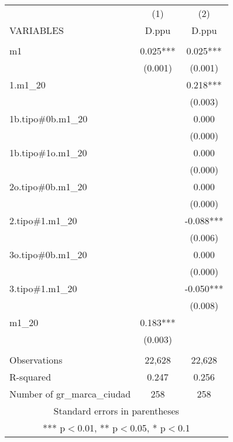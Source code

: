 \begin{tabular}{lcc} \hline
 & (1) & (2) \\
VARIABLES & D.ppu & D.ppu \\ \hline
 &  &  \\
m1 & 0.025*** & 0.025*** \\
 & (0.001) & (0.001) \\
1.m1\_20 &  & 0.218*** \\
 &  & (0.003) \\
1b.tipo\#0b.m1\_20 &  & 0.000 \\
 &  & (0.000) \\
1b.tipo\#1o.m1\_20 &  & 0.000 \\
 &  & (0.000) \\
2o.tipo\#0b.m1\_20 &  & 0.000 \\
 &  & (0.000) \\
2.tipo\#1.m1\_20 &  & -0.088*** \\
 &  & (0.006) \\
3o.tipo\#0b.m1\_20 &  & 0.000 \\
 &  & (0.000) \\
3.tipo\#1.m1\_20 &  & -0.050*** \\
 &  & (0.008) \\
m1\_20 & 0.183*** &  \\
 & (0.003) &  \\
 &  &  \\
Observations & 22,628 & 22,628 \\
R-squared & 0.247 & 0.256 \\
 Number of gr\_marca\_ciudad & 258 & 258 \\ \hline
\multicolumn{3}{c}{ Standard errors in parentheses} \\
\multicolumn{3}{c}{ *** p$<$0.01, ** p$<$0.05, * p$<$0.1} \\
\end{tabular}
